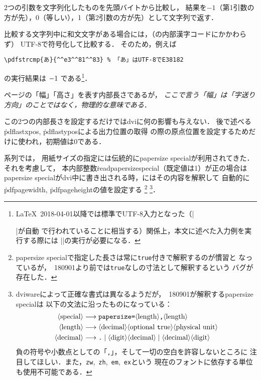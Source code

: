 \documentclass[a4paper,11pt,nomag]{jsarticle}
\begin{document}
\begin{cslist}
  2つの引数を文字列化したものを先頭バイトから比較し，
  結果を$-1$（第1引数の方が先），0（等しい），1（第2引数の方が先）として文字列で返す．

  比較する文字列中に和文文字がある場合には，（\epTeX の内部漢字コードにかかわらず）
  UTF-8で符号化して比較する．
  そのため，例えば
\begin{verbatim}
\pdfstrcmp{あ}{^^e3^^81^^83} % 「あ」はUTF-8でE38182
\end{verbatim}
  の実行結果は
    {\ifdefined\UseRawInputEncoding\UseRawInputEncoding\fi
    $\pdfstrcmp{あ}{^^e3^^81^^83}$}%
  である\footnote{%
    \LaTeX~2018-04-01以降では標準でUTF-8入力となった（|\usepackage[utf8]{inputenc}|が自動
    で行われていることに相当する）関係上，本文に述べた入力例を実行する際には
    |\UseRawInputEncoding|の実行が必要になる．
  }．

  ページの「幅」「高さ」を表す内部長さであるが，
  \emph{ここで言う「幅」は「字送り方向」のことではなく，物理的な意味である}．

  この2つの内部長さを設定するだけではdviに何の影響も与えない．
  後で述べる\.{pdflastxpos}, \.{pdflastypos}による出力位置の取得
  の際の原点位置を設定するためだけに使われ，初期値は0である．

  \pTeX 系列では，
  用紙サイズの指定には伝統的にpapersize specialが利用されてきた．それを考慮して，
  本内部整数\.{readpapersizespecial}（既定値は1）が正の場合は
  papersize specialがdvi中に書き出される時，\epTeX にはその内容を解釈して
  自動的に\.{pdfpagewidth}, \.{pdfpageheight}の値を設定する
  \footnote{%
  papersize specialで指定した長さは常に\texttt{true}付きで解釈するのが慣習と
  なっているが，\epTeX~180901より前では\texttt{true}なしの寸法として解釈するという
  バグが存在した．}%
  \footnote{%
  dviwareによって正確な書式は異なるようだが，\epTeX~180901が解釈するpapersize specialは
  以下の文法に沿ったものになっている：
\def\<#1>{\langle\mbox{#1}\rangle}
\begin{align*}
  \<special> &\longrightarrow \texttt{papersize=}\<length>\texttt{,}\<length>\\
  \<length>  &\longrightarrow \<decimal>
    \<optional~\texttt{true}>\<physical unit>\\
  \<decimal> &\longrightarrow \texttt{.} \mid \<digit>\<decimal> \mid
    \<decimal>\<digit>
\end{align*}
  負の符号や小数点としての「\texttt{,}」，そして一切の空白を許容しないところに
  注目してほしい．また，\texttt{zw},~\texttt{zh},~\texttt{em},~\texttt{ex}という
  現在のフォントに依存する単位も使用不可能である．
  }．


\end{cslist}
\end{document}
